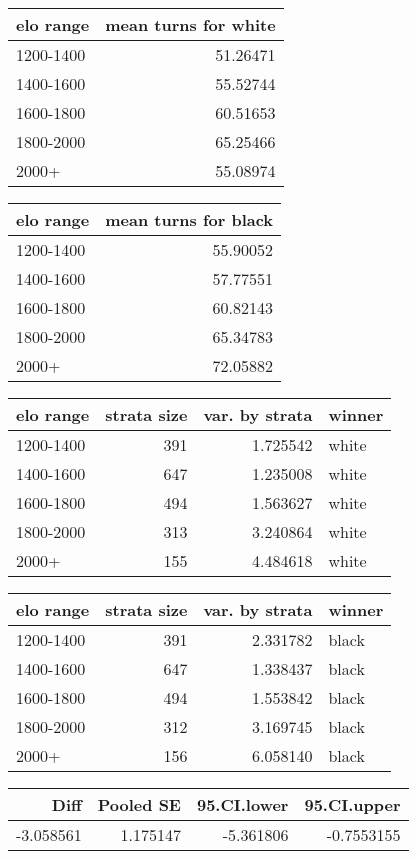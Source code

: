 \documentclass[11pt,]{article}
\begin{document}
\begin{table}[h] \centering  
\begin{tabular}{l|r}
\hline
elo range & mean turns for white\\
\hline
1200-1400 & 51.26471\\
\hline
1400-1600 & 55.52744\\
\hline
1600-1800 & 60.51653\\
\hline
1800-2000 & 65.25466\\
\hline
2000+ & 55.08974\\
\hline
\end{tabular} \hspace{1cm} \centering  
\begin{tabular}{l|r}
\hline
elo range & mean turns for black\\
\hline
1200-1400 & 55.90052\\
\hline
1400-1600 & 57.77551\\
\hline
1600-1800 & 60.82143\\
\hline
1800-2000 & 65.34783\\
\hline
2000+ & 72.05882\\
\hline
\end{tabular} \end{table}\begin{table}[h] \centering  
\begin{tabular}{l|r|r|l}
\hline
elo range & strata size & var. by strata & winner\\
\hline
1200-1400 & 391 & 1.725542 & white\\
\hline
1400-1600 & 647 & 1.235008 & white\\
\hline
1600-1800 & 494 & 1.563627 & white\\
\hline
1800-2000 & 313 & 3.240864 & white\\
\hline
2000+ & 155 & 4.484618 & white\\
\hline
\end{tabular} \hspace{0.5cm} \centering  
\begin{tabular}{l|r|r|l}
\hline
elo range & strata size & var. by strata & winner\\
\hline
1200-1400 & 391 & 2.331782 & black\\
\hline
1400-1600 & 647 & 1.338437 & black\\
\hline
1600-1800 & 494 & 1.553842 & black\\
\hline
1800-2000 & 312 & 3.169745 & black\\
\hline
2000+ & 156 & 6.058140 & black\\
\hline
\end{tabular} \end{table}\begin{table}[!h]
\centering
\begin{tabular}{r|r|r|r}
\hline
Diff & Pooled SE & 95.CI.lower & 95.CI.upper\\
\hline
-3.058561 & 1.175147 & -5.361806 & -0.7553155\\
\hline
\end{tabular}
\end{table}
\newpage
\end{document}
